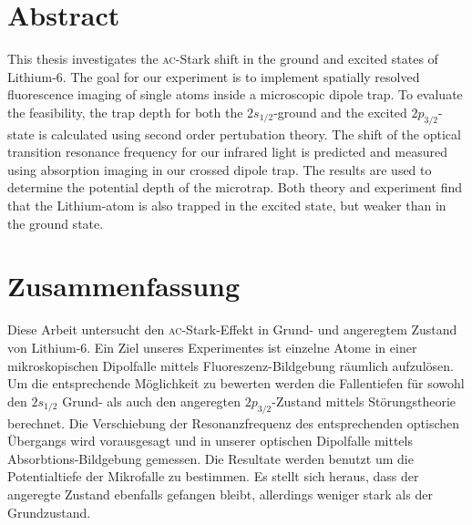 \section*{Abstract}

This thesis investigates the \textsc{ac}-Stark shift in the ground and excited states of Lithium-6. 
The goal for our experiment is to implement spatially resolved fluorescence imaging of single atoms inside a microscopic dipole trap. To evaluate the feasibility, the trap depth for both the $2s_{1/2}$-ground and the excited $2p_{3/2}$-state is calculated using second order pertubation theory. The shift of the optical transition resonance frequency for our infrared light is predicted and measured using absorption imaging in our crossed dipole trap. The results are used to determine the potential depth of the microtrap. Both theory and experiment find that the Lithium-atom is also trapped in the excited state, but weaker than in the ground state.

\section*{Zusammenfassung}

Diese Arbeit untersucht den \textsc{ac}-Stark-Effekt in Grund- und angeregtem Zustand von Lithium-6. Ein Ziel unseres Experimentes ist einzelne Atome in einer mikroskopischen Dipolfalle mittels Fluoreszenz-Bildgebung räumlich aufzulösen. Um die entsprechende Möglichkeit zu bewerten werden die Fallentiefen für sowohl den $2s_{1/2}$ Grund- als auch den angeregten $2p_{3/2}$-Zustand mittels Störungstheorie berechnet. Die Verschiebung der Resonanzfrequenz des entsprechenden optischen Übergangs wird vorausgesagt und in unserer optischen Dipolfalle mittels Absorbtions-Bildgebung gemessen. Die Resultate werden benutzt um die Potentialtiefe der Mikrofalle zu bestimmen. Es stellt sich heraus, dass der angeregte Zustand ebenfalls gefangen bleibt, allerdings weniger stark als der Grundzustand.